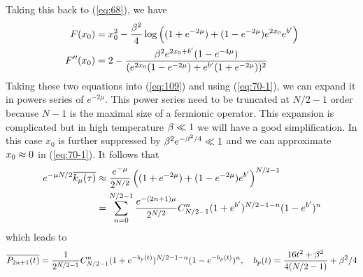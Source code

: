 \documentclass[11pt]{article}
\renewcommand{\>}{\rangle}
\newcommand{\<}{\langle}
\begin{document}
Taking this back to (\ref{eq:68}), we have
\begin{align}
F(x_{0}) & =x_{0}^{2}-\frac{\beta^{2}}{4}\log\left((1+e^{-2\mu})+(1-e^{-2\mu})e^{2x_{0}}e^{b'}\right)\\
F''(x_{0}) & =2-\frac{\beta^{2}e^{2x_{0}+b'}(1-e^{-4\mu})}{(e^{2x_{0}}(1-e^{-2\mu})+e^{b'}(1+e^{-2\mu}))^{2}}
\end{align}
Taking these two equations into (\ref{eq:109}) and using (\ref{eq:70-1}),
we can expand it in powers series of $e^{-2\mu}$. This power series
need to be truncated at $N/2-1$ order because $N-1$ is the maximal
size of a fermionic operator. This expansion is complicated but in
high temperature $\beta\ll1$ we will have a good simplification. In
this case $x_{0}$ is further suppressed by $\beta^{2}e^{-\beta^{2}/4}\ll1$
and we can approximate $x_{0}\approx0$ in (\ref{eq:70-1}). It follows
that
\begin{align}
e^{-\mu N/2}\overline{k_{\mu}(\tau)} & \approx\frac{e^{-\mu}}{2^{N/2}}\left((1+e^{-2\mu})+(1-e^{-2\mu})e^{b'}\right)^{N/2-1}\nonumber \\
 & =\sum_{n=0}^{N/2-1}\frac{e^{-(2n+1)\mu}}{2^{N/2}}C_{N/2-1}^{n}(1+e^{b'})^{N/2-1-n}(1-e^{b'})^{n}
\end{align}
which leads to
\begin{equation}
\overline{P_{2n+1}(t)}=\frac{1}{2^{N/2-1}}C_{N/2-1}^{n}(1+e^{-b_{p}(t)})^{N/2-1-n}(1-e^{-b_{p}(t)})^{n},\quad b_{p}(t)=\frac{16t^{2}+\beta^{2}}{4(N/2-1)}+\beta^{2}/4\label{eq:117}
\end{equation}
\end{document}
